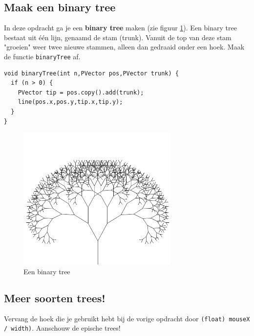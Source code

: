 \documentclass{../qh_exercise}
\begin{document}
\subsection{Maak een binary tree}
In deze opdracht ga je een \textbf{binary tree} maken (zie figuur \ref{fig:binary_tree}). Een binary tree bestaat uit \'e\'en lijn, genaamd de stam (trunk). Vanuit de top van deze stam "groeien" weer twee nieuwe stammen, alleen dan gedraaid onder een hoek. Maak de functie \texttt{binaryTree} af.
\begin{lstlisting}
void binaryTree(int n,PVector pos,PVector trunk) {
  if (n > 0) {
    PVector tip = pos.copy().add(trunk);
    line(pos.x,pos.y,tip.x,tip.y);
  }
}
\end{lstlisting}
\begin{figure}[H]
	\centering
	\includegraphics[width=8cm]{binary_tree.png}
	\caption{Een binary tree}
	\label{fig:binary_tree}
\end{figure}

\subsection{Meer soorten trees!}
Vervang de hoek die je gebruikt hebt bij de vorige opdracht door \texttt{(float) mouseX / width)}. Aanschouw de epische trees!
\end{document}
